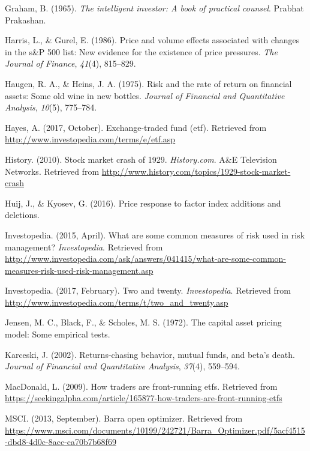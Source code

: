 \documentclass[12pt,twoside]{reedthesis}
\theoremstyle{definition}
\theoremstyle{definition}
\theoremstyle{definition}
\theoremstyle{remark}
\begin{document}
\hypertarget{ref-graham1965}{}
Graham, B. (1965). \emph{The intelligent investor: A book of practical
counsel}. Prabhat Prakashan.

\hypertarget{ref-harris1986}{}
Harris, L., \& Gurel, E. (1986). Price and volume effects associated
with changes in the s\&P 500 list: New evidence for the existence of
price pressures. \emph{The Journal of Finance}, \emph{41}(4), 815--829.

\hypertarget{ref-haugen1975}{}
Haugen, R. A., \& Heins, J. A. (1975). Risk and the rate of return on
financial assets: Some old wine in new bottles. \emph{Journal of
Financial and Quantitative Analysis}, \emph{10}(5), 775--784.

\hypertarget{ref-hayes2017}{}
Hayes, A. (2017, October). Exchange-traded fund (etf). Retrieved from
\url{http://www.investopedia.com/terms/e/etf.asp}

\hypertarget{ref-history2010}{}
History. (2010). Stock market crash of 1929. \emph{History.com}. A\&E
Television Networks. Retrieved from
\url{http://www.history.com/topics/1929-stock-market-crash}

\hypertarget{ref-huij2016}{}
Huij, J., \& Kyosev, G. (2016). Price response to factor index additions
and deletions.

\hypertarget{ref-investopedia2015}{}
Investopedia. (2015, April). What are some common measures of risk used
in risk management? \emph{Investopedia}. Retrieved from
\url{http://www.investopedia.com/ask/answers/041415/what-are-some-common-measures-risk-used-risk-management.asp}

\hypertarget{ref-investopedia2017}{}
Investopedia. (2017, February). Two and twenty. \emph{Investopedia}.
Retrieved from
\url{http://www.investopedia.com/terms/t/two_and_twenty.asp}

\hypertarget{ref-jensen1972}{}
Jensen, M. C., Black, F., \& Scholes, M. S. (1972). The capital asset
pricing model: Some empirical tests.

\hypertarget{ref-karceski2002}{}
Karceski, J. (2002). Returns-chasing behavior, mutual funds, and beta's
death. \emph{Journal of Financial and Quantitative Analysis},
\emph{37}(4), 559--594.

\hypertarget{ref-macdonald2009}{}
MacDonald, L. (2009). How traders are front-running etfs. Retrieved from
\url{https://seekingalpha.com/article/165877-how-traders-are-front-running-etfs}

\hypertarget{ref-msci2013}{}
MSCI. (2013, September). Barra open optimizer. Retrieved from
\url{https://www.msci.com/documents/10199/242721/Barra_Optimizer.pdf/5acf4515-dbd8-4d0c-8acc-ca70b7b68f69}
\end{document}
